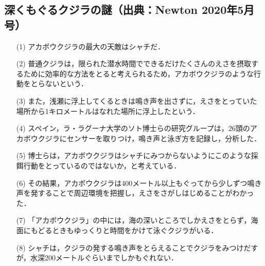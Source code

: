 \documentclass[11pt, a4paper]{jsarticle}
\begin{document}
\subsection{深くもぐるクジラの謎（出典：Newton 2020年5月号）}
\begin{itemize}
\item[(1)]アカボウクジラの最大の天敵はシャチだ．
\item[(2)]普通クジラは，限られた潜水時間でできるだけたくさんのえさを摂取するために効率的な方法をとると考えられるため，アカボウクジラのような行動をとらないという．
\item[(3)]また，浅瀬に浮上してくるときは鳴き声を出さずに，えさをとっていた場所から1キロメートルはなれた場所に浮上したという．
\item[(4)]スペイン，ラ・ラグーナ大学のソト博士らの研究グループは，26頭のアカボウクジラにセンサーを取りつけ，鳴き声と泳ぎ方を記録し，分析した．
\item[(5)]博士らは，アカボウクジラはシャチにみつからないようにこのような採餌行動をとっているのではないか，と考えている．
\item[(6)]その結果，アカボウクジラは400メートル以上もぐってから少しずつ鳴き声を発することで周辺環境を把握し，えさをさがしはじめることがわかった．
\item[(7)]「アカボウクジラ」の中には，海の深いところでしかえさをとらず，海面にもどるときもゆっくりと時間をかけて泳ぐクジラがいる．
\item[(8)]シャチは，クジラの発する鳴き声をとらえることでクジラをみつけだすが，水深200メートルぐらいまでしかもぐれない．
\end{itemize}

\end{document}
